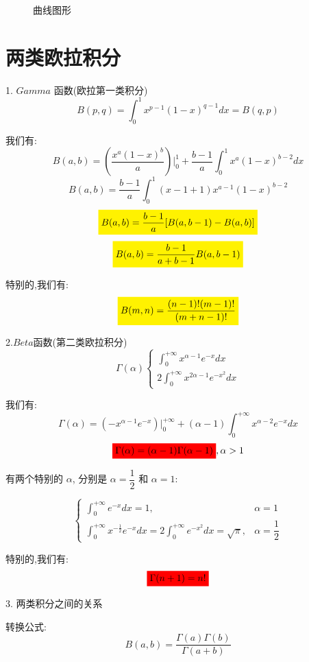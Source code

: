 \begin{figure}[H]
	\caption{曲线图形}
\end{figure}

\section{两类欧拉积分}

\begin{definition}	
	1. $Gamma$ 函数(欧拉第一类积分)
	$$B(p,q)=\int_{0}^{1}x^{p-1}(1-x)^{q-1}dx=B(q,p)$$
	
	我们有:  $$B(a,b)=(\frac{x^a(1-x)^b}{a})|_{0}^{1}+\frac{b-1}{a}\int_{0}^{1}x^{a}(1-x)^{b-2}dx$$
	$$B(a,b)=\frac{b-1}{a}\int_{0}^{1}(x-1+1)x^{a-1}(1-x)^{b-2}$$
	$$\mathcolorbox{yellow}{B(a,b)=\frac{b-1}{a}[B(a,b-1)-B(a,b)]}$$ $$\mathcolorbox{yellow}{B(a,b)=\frac{b-1}{a+b-1}B(a,b-1)}$$
	
	特别的,我们有:  $$\mathcolorbox{yellow}{B(m,n)=\frac{(n-1)!(m-1)!}{(m+n-1)!}}$$
	
	2.$Beta$函数(第二类欧拉积分)
	$$\Gamma(\alpha)\begin{cases} \int_{0}^{+\infty}x^{\alpha-1}e^{-x}dx\\ 2\int_{0}^{+\infty}x^{2\alpha-1}e^{-x^{2}}dx \end{cases}$$
	
	我们有:  $$\Gamma(\alpha)=(-x^{\alpha-1}e^{-x})|_{0}^{+\infty}+(\alpha-1)\int_{0}^{+\infty}x^{\alpha-2}e^{-x}dx$$
	$$\mathcolorbox{red}{\Gamma(\alpha)=(\alpha-1)\Gamma(\alpha-1)},\alpha>1$$

	有两个特别的 $\alpha$, 分别是 $\alpha = \dfrac{1}{2}$ 和 $\alpha = 1$:

	$$\begin{cases} \int_{0}^{+\infty}e^{-x}dx = 1, & \alpha =1 \\ 
		\int_{0}^{+\infty}x^{-\frac{1}{2}}e^{-x}dx = 2\int_{0}^{+\infty}e^{-x^{2}}dx = \sqrt{\pi}, & \alpha =\dfrac{1}{2}\end{cases}$$
	
	特别的,我们有:  $$\mathcolorbox{red}{\Gamma(n+1)=n!}$$
	
	3. 两类积分之间的关系
	
	转换公式:  
	$$B(a,b)=\frac{\Gamma(a)\Gamma(b)}{\Gamma(a+b)}$$
	
\end{definition}


